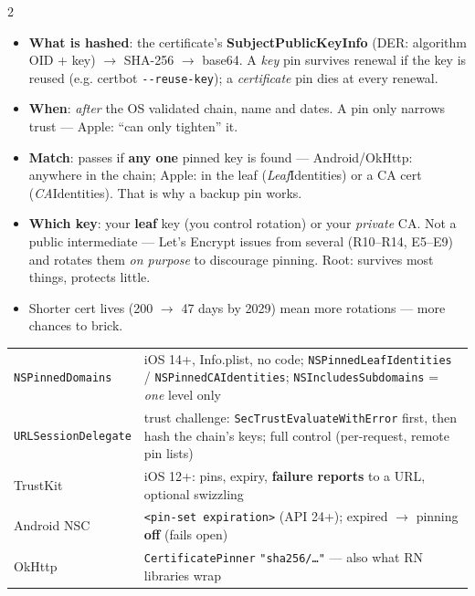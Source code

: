 \documentclass[8pt]{extarticle}
\newcommand\ct[1]{\texttt{#1}}
\newcommand\hd[1]{\par\vspace{3pt}\noindent{\bfseries\color{sheetBlue}#1}\par\vspace{1pt}}
\begin{document}
\begin{multicols}{2}
\raggedright{}

\hd{How it works}
\begin{itemize}
  \item \textbf{What is hashed}: the certificate's \textbf{SubjectPublicKeyInfo} (DER: algorithm OID + key)
        $\to$ SHA-256 $\to$ base64. A \emph{key} pin survives renewal if the key is reused (e.g.
        certbot \ct{\hbox{-}\hbox{-}reuse-key}); a \emph{certificate} pin dies at every renewal.
  \item \textbf{When}: \emph{after} the OS validated chain, name and dates. A pin only narrows trust — Apple:
        ``can only tighten'' it.
  \item \textbf{Match}: passes if \textbf{any one} pinned key is found — Android/OkHttp: anywhere in the chain;
        Apple: in the leaf (\emph{Leaf}Identities) or a CA cert (\emph{CA}Identities). That is why a backup pin works.
  \item \textbf{Which key}: your \textbf{leaf} key (you control rotation) or your \emph{private} CA. Not a public
        intermediate — Let's Encrypt issues from several (R10–R14, E5–E9) and rotates them \emph{on purpose}
        to discourage pinning. Root: survives most things, protects little.
  \item Shorter cert lives (200 $\to$ 47 days by 2029) mean more rotations — more chances to brick.
\end{itemize}

\hd{Implementations}
{\footnotesize
\begin{tabular}{@{}>{\raggedright\arraybackslash}p{19mm}>{\raggedright\arraybackslash}p{53mm}@{}}
\toprule
\ct{NSPinnedDomains} & iOS 14+, Info.plist, no code; \ct{NSPinnedLeafIdentities} / \ct{NSPinnedCAIdentities};
  \ct{NSIncludesSubdomains} = \emph{one} level only \\
\ct{URLSessionDelegate} & trust challenge: \ct{SecTrustEvaluateWithError} first, then hash the chain's keys; full
  control (per-request, remote pin lists) \\
TrustKit & iOS 12+: pins, expiry, \textbf{failure reports} to a URL, optional swizzling \\
Android NSC & \ct{<pin-set expiration>} (API 24+); expired $\to$ pinning \textbf{off} (fails open) \\
OkHttp & \ct{CertificatePinner} \ct{"sha256/…"} — also what RN libraries wrap \\
\bottomrule
\end{tabular}}


\end{multicols}
\end{document}
